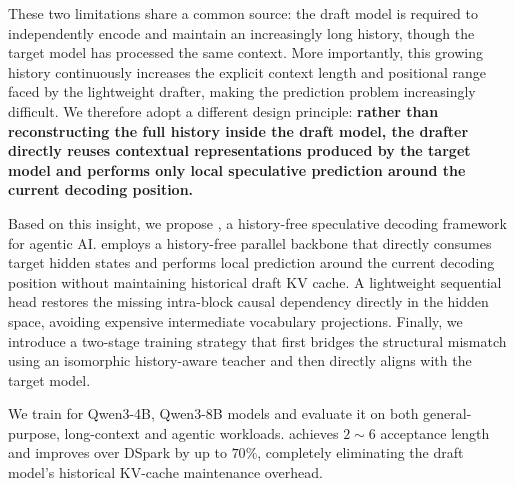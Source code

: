 These two limitations share a common source: the draft model is required to independently encode and maintain an increasingly long history, though the target model has processed the same context. More importantly, this growing history continuously increases the explicit context length and positional range faced by the lightweight drafter, making the prediction problem increasingly difficult. We therefore adopt a different design principle: \textbf{rather than reconstructing the full history inside the draft model, the drafter directly reuses contextual representations produced by the target model and performs only local speculative prediction around the current decoding position.} 

Based on this insight, we propose \we, a history-free speculative decoding framework for agentic AI. \we employs a history-free parallel backbone that directly consumes target hidden states and performs local prediction around the current decoding position without maintaining historical draft KV cache. A lightweight sequential head restores the missing intra-block causal dependency directly in the hidden space, avoiding expensive intermediate vocabulary projections. Finally, we introduce a two-stage training strategy that first bridges the structural mismatch using an isomorphic history-aware teacher and then directly aligns \we with the target model. 

We train \we for Qwen3-4B, Qwen3-8B models and evaluate it on both general-purpose, long-context and agentic workloads. \we achieves \(2\sim6\) acceptance length and improves over DSpark by up to \(70\%\), completely eliminating the draft model's historical KV-cache maintenance overhead.


